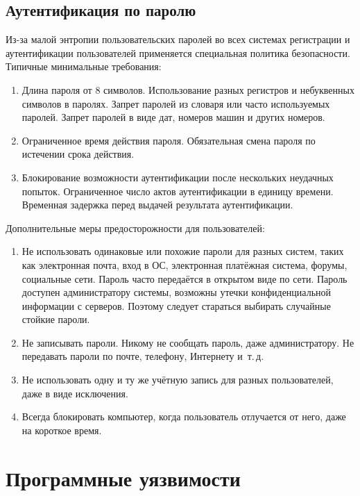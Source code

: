 \section{Аутентификация по паролю}

Из-за малой энтропии пользовательских паролей во всех системах регистрации и аутентификации пользователей применяется специальная политика безопасности. Типичные минимальные требования:
\begin{enumerate}
    \item Длина пароля от 8 символов. Использование разных регистров и небуквенных символов в паролях. Запрет паролей из словаря или часто используемых паролей. Запрет паролей в виде дат, номеров машин и других номеров.
    \item Ограниченное время действия пароля. Обязательная смена пароля по истечении срока действия.
    \item Блокирование возможности аутентификации после нескольких неудачных попыток. Ограниченное число актов аутентификации в единицу времени. Временная задержка перед выдачей результата аутентификации.
\end{enumerate}

Дополнительные меры предосторожности для пользователей:
\begin{enumerate}
    \item Не использовать одинаковые или похожие пароли для разных систем, таких как электронная почта, вход в ОС, электронная платёжная система, форумы, социальные сети. Пароль часто передаётся в открытом виде по сети. Пароль доступен администратору системы, возможны утечки конфиденциальной информации с серверов. Поэтому следует стараться выбирать случайные стойкие пароли.
    \item Не записывать пароли. Никому не сообщать пароль, даже администратору. Не передавать пароли по почте, телефону, Интернету и~т.\,д.
    \item Не использовать одну и ту же учётную запись для разных пользователей, даже в виде исключения.
    \item Всегда блокировать компьютер, когда пользователь отлучается от него, даже на короткое время.
\end{enumerate}





\chapter{Программные уязвимости}

